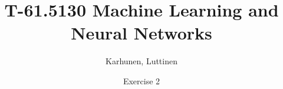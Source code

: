 
\title{T-61.5130 Machine Learning and Neural Networks}
\author{Karhunen, Luttinen}
\date{Exercise 2}

\usepackage{cancel}
\usepackage{listings}

\newcommand{\vect}[1]{{\bf{#1}}}
\newcommand{\svect}[1]{\boldsymbol{#1}}
\newcommand{\matr}[1]{\boldsymbol{#1}}
\newcommand{\vw}{{\bf{w}}}
\newcommand{\ve}{{\bf{e}}}
\newcommand{\vx}{{\bf{x}}}



\maketitle
\thispagestyle{empty}

